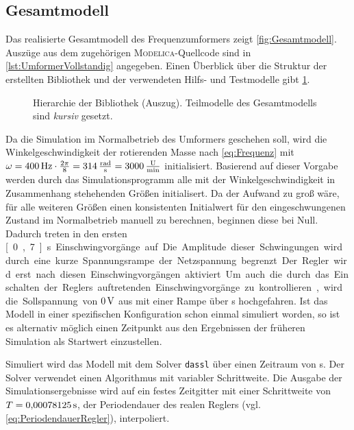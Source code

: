 \subsection{Gesamtmodell}\label{gesamtmodell}
Das realisierte Gesamtmodell des Frequenzumformers zeigt \cref{fig:Gesamtmodell}. Auszüge aus dem zugehörigen \textsc{Modelica}-Quellcode sind in \cref{lst:UmformerVollstandig} angegeben. Einen Überblick über die Struktur der erstellten  Bibliothek und der verwendeten Hilfs- und Testmodelle gibt \cref{fig:StrukturModBib}.

\begin{figure}[t!]
	
	\caption{Hierarchie der  Bibliothek (Auszug). Teilmodelle des Gesamtmodells sind \emph{kursiv} gesetzt.\label{fig:StrukturModBib}}
\end{figure}

Da die Simulation im Normalbetrieb des Umformers geschehen soll, wird die Winkelgeschwindigkeit der rotierenden Masse nach \cref{eq:Frequenz} mit $\omega = \unit[400]{Hz}\cdot \frac{2\pi}{8} = \unit[314]{\frac{rad}{s}} = \unit[3000]{\frac{U}{min}}$ initialisiert. Basierend auf dieser Vorgabe werden durch das Simulationsprogramm alle mit der Winkelgeschwindigkeit in Zusammenhang stehehenden Größen initialisert. Da der Aufwand zu groß wäre, für alle weiteren Größen einen konsistenten Initialwert für den eingeschwungenen Zustand im Normalbetrieb manuell zu berechnen, beginnen diese bei Null. Dadurch treten in den ersten \unit[0{,}7]{s} Einschwingvorgänge auf. Die Amplitude dieser Schwingungen wird durch eine kurze Spannungsrampe der Netzspannung begrenzt. Der Regler wird erst nach diesen Einschwingvorgängen aktiviert. Um auch die durch das Einschalten der Reglers auftretenden Einschwingvorgänge zu kontrollieren, wird die Sollspannung von $\unit[0]{V}$ aus mit einer Rampe über \unit[0,3]{s} hochgefahren. Ist das Modell in einer spezifischen Konfiguration schon einmal simuliert worden, so ist es alternativ möglich einen Zeitpunkt aus den Ergebnissen der früheren Simulation als Startwert einzustellen.

Simuliert wird das Modell mit dem Solver \texttt{dassl} über einen Zeitraum von \unit[3]{s}. Der Solver verwendet einen Algorithmus mit variabler Schrittweite. Die Ausgabe der Simulationsergebnisse wird auf ein festes Zeitgitter mit einer Schrittweite von $T=\unit[0{,}00078125]{s}$, der Periodendauer des realen Reglers (vgl. \cref{eq:PeriodendauerRegler}), interpoliert. 
